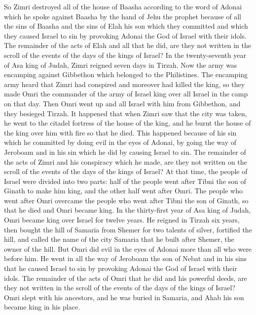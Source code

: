 \begin{biblechapter}
\verse So Zimri destroyed all of the house of Baasha according to the word of Adonai which he spoke against Baasha by the hand of Jehu the prophet
\verse because of all the sins of Baasha and the sins of Elah his son which they committed and which they caused Israel to sin by provoking Adonai the God of Israel with their idols.
\verse The remainder of the acts of Elah and all that he did, are they not written in the scroll of the events of the days of the kings of Israel?
 In the twenty-seventh year of Asa king of Judah, Zimri reigned seven days in Tirzah. Now the army was encamping against Gibbethon which belonged to the Philistines.
\verse The encamping army heard that Zimri had conspired and moreover had killed the king, so they made Omri the commander of the army of Israel king over all Israel in the camp on that day.
\verse Then Omri went up and all Israel with him from Gibbethon, and they besieged Tirzah.
\verse It happened that when Zimri saw that the city was taken, he went to the citadel fortress of the house of the king, and he burnt the house of the king over him with fire so that he died.
\verse This happened because of his sin which he committed by doing evil in the eyes of Adonai, by going the way of Jeroboam and in his sin which he did by causing Israel to sin.
\verse The remainder of the acts of Zimri and his conspiracy which he made, are they not written on the scroll of the events of the days of the kings of Israel?
 At that time, the people of Israel were divided into two parts: half of the people went after Tibni the son of Ginath to make him king, and the other half went after Omri.
\verse The people who went after Omri overcame the people who went after Tibni the son of Ginath, so that he died and Omri became king.
\verse In the thirty-first year of Asa king of Judah, Omri became king over Israel for twelve years. He reigned in Tirzah six years,
\verse then bought the hill of Samaria from Shemer for two talents of silver, fortified the hill, and called the name of the city Samaria that he built after Shemer, the owner of the hill.
\verse But Omri did evil in the eyes of Adonai more than all who were before him.
\verse He went in all the way of Jeroboam the son of Nebat and in his sins that he caused Israel to sin by provoking Adonai the God of Israel with their idols.
\verse The remainder of the acts of Omri that he did and his powerful deeds, are they not written in the scroll of the events of the days of the kings of Israel?
\verse Omri slept with his ancestors, and he was buried in Samaria, and Ahab his son became king in his place.

\end{biblechapter}
